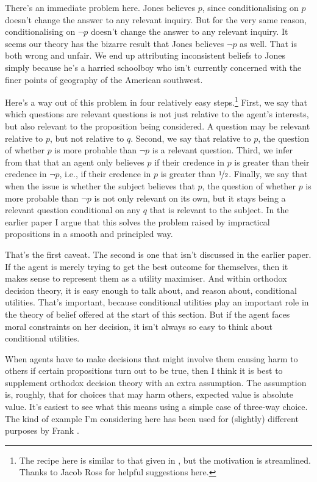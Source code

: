\documentclass[11pt,oneside]{book}
\begin{document}
There's an immediate problem here. Jones believes $p$, since conditionalising on $p$ doesn't change the answer to any relevant inquiry. But for the very same reason, conditionalising on $\neg p$ doesn't change the answer to any relevant inquiry. It seems our theory has the bizarre result that Jones believes $\neg p$ as well. That is both wrong and unfair. We end up attributing inconsistent beliefs to Jones simply because he's a harried schoolboy who isn't currently concerned with the finer points of geography of the American southwest.

Here's a way out of this problem in four relatively easy steps.\footnote{The recipe here is similar to that given in \cite{Weatherson2005-WEACWD}, but the motivation is streamlined. Thanks to Jacob Ross for helpful suggestions here.} First, we say that which questions are relevant questions is not just relative to the agent's interests, but also relevant to the proposition being considered. A question may be relevant relative to $p$, but not relative to $q$. Second, we say that relative to $p$, the question of whether $p$ is more probable than $\neg p$ is a relevant question. Third, we infer from that that an agent only believes $p$ if their credence in $p$ is greater than their credence in $\neg p$, i.e., if their credence in $p$ is greater than $\nicefrac{1}{2}$. Finally, we say that when the issue is whether the subject believes that $p$, the question of whether $p$ is more probable than $\neg p$ is not only relevant on its own, but it stays being a relevant question conditional on any $q$ that is relevant to the subject. In the earlier paper \citep{Weatherson2005-WEACWD} I argue that this solves the problem raised by impractical propositions in a smooth and principled way.

That's the first caveat. The second is one that isn't discussed in the earlier paper. If the agent is merely trying to get the best outcome for themselves, then it makes sense to represent them as a utility maximiser. And within orthodox decision theory, it is easy enough to talk about, and reason about, conditional utilities. That's important, because conditional utilities play an important role in the theory of belief offered at the start of this section. But if the agent faces moral constraints on her decision, it isn't always so easy to think about conditional utilities.

When agents have to make decisions that might involve them causing harm to others if certain propositions turn out to be true, then I think it is best to supplement orthodox decision theory with an extra assumption. The assumption is, roughly, that for choices that may harm others, expected value is absolute value. It's easiest to see what this means using a simple case of three-way choice. The kind of example I'm considering here has been used for (slightly) different purposes by Frank \cite{Jackson1991}. 
\end{document}
